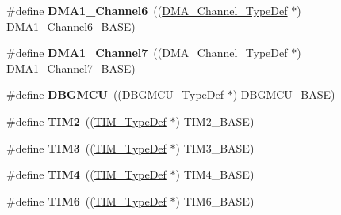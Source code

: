 \begin{DoxyCompactItemize}
\item 
\hypertarget{group___peripheral__declaration_gac013c4376e4797831b5ddd2a09519df8}{\#define {\bfseries D\-M\-A1\-\_\-\-Channel6}~((\hyperlink{struct_d_m_a___channel___type_def}{D\-M\-A\-\_\-\-Channel\-\_\-\-Type\-Def} $\ast$) D\-M\-A1\-\_\-\-Channel6\-\_\-\-B\-A\-S\-E)}\label{group___peripheral__declaration_gac013c4376e4797831b5ddd2a09519df8}

\item 
\hypertarget{group___peripheral__declaration_ga4f9c23b3d1add93ed206b5c9afa5cda3}{\#define {\bfseries D\-M\-A1\-\_\-\-Channel7}~((\hyperlink{struct_d_m_a___channel___type_def}{D\-M\-A\-\_\-\-Channel\-\_\-\-Type\-Def} $\ast$) D\-M\-A1\-\_\-\-Channel7\-\_\-\-B\-A\-S\-E)}\label{group___peripheral__declaration_ga4f9c23b3d1add93ed206b5c9afa5cda3}

\item 
\hypertarget{group___peripheral__declaration_ga92ec6d9ec2251fda7d4ce09748cd74b4}{\#define {\bfseries D\-B\-G\-M\-C\-U}~((\hyperlink{struct_d_b_g_m_c_u___type_def}{D\-B\-G\-M\-C\-U\-\_\-\-Type\-Def} $\ast$) \hyperlink{group___peripheral__memory__map_ga4adaf4fd82ccc3a538f1f27a70cdbbef}{D\-B\-G\-M\-C\-U\-\_\-\-B\-A\-S\-E})}\label{group___peripheral__declaration_ga92ec6d9ec2251fda7d4ce09748cd74b4}

\item 
\hypertarget{group___peripheral__declaration_ga3cfac9f2e43673f790f8668d48b4b92b}{\#define {\bfseries T\-I\-M2}~((\hyperlink{struct_t_i_m___type_def}{T\-I\-M\-\_\-\-Type\-Def} $\ast$) T\-I\-M2\-\_\-\-B\-A\-S\-E)}\label{group___peripheral__declaration_ga3cfac9f2e43673f790f8668d48b4b92b}

\item 
\hypertarget{group___peripheral__declaration_ga61ee4c391385607d7af432b63905fcc9}{\#define {\bfseries T\-I\-M3}~((\hyperlink{struct_t_i_m___type_def}{T\-I\-M\-\_\-\-Type\-Def} $\ast$) T\-I\-M3\-\_\-\-B\-A\-S\-E)}\label{group___peripheral__declaration_ga61ee4c391385607d7af432b63905fcc9}

\item 
\hypertarget{group___peripheral__declaration_ga91a09bad8bdc7a1cb3d85cf49c94c8ec}{\#define {\bfseries T\-I\-M4}~((\hyperlink{struct_t_i_m___type_def}{T\-I\-M\-\_\-\-Type\-Def} $\ast$) T\-I\-M4\-\_\-\-B\-A\-S\-E)}\label{group___peripheral__declaration_ga91a09bad8bdc7a1cb3d85cf49c94c8ec}

\item 
\hypertarget{group___peripheral__declaration_gac7b4ed55f9201b498b38c962cca97314}{\#define {\bfseries T\-I\-M6}~((\hyperlink{struct_t_i_m___type_def}{T\-I\-M\-\_\-\-Type\-Def} $\ast$) T\-I\-M6\-\_\-\-B\-A\-S\-E)}\label{group___peripheral__declaration_gac7b4ed55f9201b498b38c962cca97314}


\end{DoxyCompactItemize}
